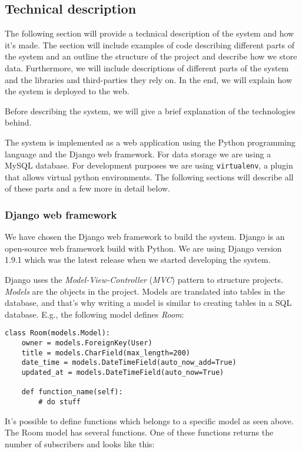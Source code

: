 \subsection{Technical description}


The following section will provide a technical description of the system and how it's made. The section will include examples of code describing different parts of the system and an outline the structure of the project and describe how we store data. Furthermore, we will include descriptions of different parts of the system and the libraries and third-parties they rely on. In the end, we will explain how the system is deployed to the web.

Before describing the system, we will give a brief explanation of the technologies behind.

The system is implemented as a web application using the Python programming language and the Django web framework. For data storage we are using a MySQL database.
For development purposes we are using \texttt{virtualenv}, a plugin that allows virtual python environments. The following sections will describe all of these parts and a few more in detail below.

\subsubsection*{Django web framework}
We have chosen the Django web framework to build the system. Django is an open-source web framework build with Python. We are using Django version 1.9.1 which was the latest release when we started developing the system.

Django uses the \emph{Model-View-Controller} (\emph{MVC}) pattern to structure projects. \emph{Models} are the objects in the project. Models are translated into tables in the database, and that's why writing a model is similar to creating tables in a SQL database. E.g., the following model defines \emph{Room}: 

\begin{lstlisting}[caption=The Room Class, label=lst:room-class]
class Room(models.Model):
    owner = models.ForeignKey(User)
    title = models.CharField(max_length=200)
    date_time = models.DateTimeField(auto_now_add=True)
    updated_at = models.DateTimeField(auto_now=True)
    
    def function_name(self):
        # do stuff
\end{lstlisting}
It's possible to define functions which belongs to a specific model as seen above. The Room model has several functions. One of these functions returns the number of subscribers and looks like this:

